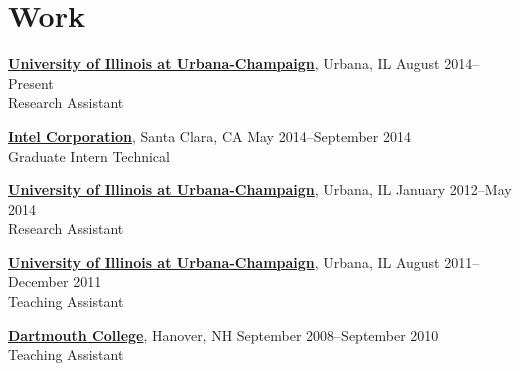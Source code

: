 \section{\sc Work}
{\href{http://www.illinois.edu/}{{\bf University of Illinois at Urbana-Champaign}}}, Urbana, IL \hfill August 2014--Present\\
Research Assistant

{\href{http://www.intel.com/}{{\bf Intel Corporation}}}, Santa Clara, CA \hfill May 2014--September 2014\\
Graduate Intern Technical

{\href{http://www.illinois.edu/}{{\bf University of Illinois at Urbana-Champaign}}}, Urbana, IL \hfill January 2012--May 2014\\
Research Assistant

{\href{http://www.illinois.edu/}{{\bf University of Illinois at Urbana-Champaign}}}, Urbana, IL \hfill August 2011--December 2011\\
Teaching Assistant

{\href{http://www.dartmouth.edu/}{{\bf Dartmouth College}}}, Hanover, NH \hfill September 2008--September 2010\\
Teaching Assistant
